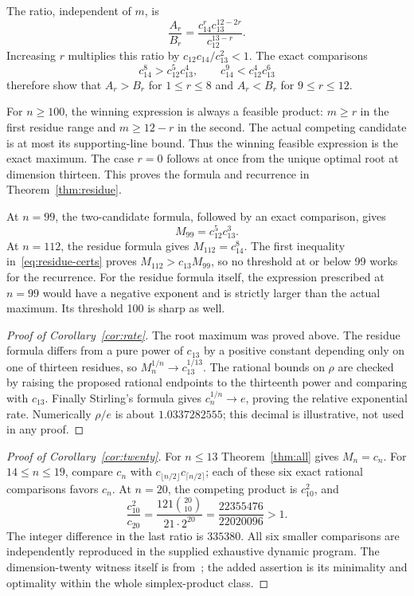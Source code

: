 \documentclass[11pt]{article}
\theoremstyle{remark}\newtheorem{remark}[theorem]{Remark}
\begin{document}
The ratio, independent of $m$, is
\[
 \frac{A_r}{B_r}
 =\frac{c_{14}^{r}c_{13}^{12-2r}}{c_{12}^{13-r}}.
\]
Increasing $r$ multiplies this ratio by $c_{12}c_{14}/c_{13}^2<1$. The exact comparisons
\begin{equation}\label{eq:residue-certs}
 c_{14}^{8}>c_{12}^{5}c_{13}^{4},\qquad
 c_{14}^{9}<c_{12}^{4}c_{13}^{6}
\end{equation}
therefore show that $A_r>B_r$ for $1\le r\le8$ and $A_r<B_r$ for $9\le r\le12$.

For $n\ge100$, the winning expression is always a feasible product: $m\ge r$ in the first residue range and $m\ge12-r$ in the second. The actual competing candidate is at most its supporting-line bound. Thus the winning feasible expression is the exact maximum. The case $r=0$ follows at once from the unique optimal root at dimension thirteen. This proves the formula and recurrence in Theorem~\ref{thm:residue}.

At $n=99$, the two-candidate formula, followed by an exact comparison, gives
\[
 M_{99}=c_{12}^{5}c_{13}^{3}.
\]
At $n=112$, the residue formula gives $M_{112}=c_{14}^{8}$. The first inequality in~\eqref{eq:residue-certs} proves $M_{112}>c_{13}M_{99}$, so no threshold at or below 99 works for the recurrence. For the residue formula itself, the expression prescribed at $n=99$ would have a negative exponent and is strictly larger than the actual maximum. Its threshold 100 is sharp as well.

\begin{proof}[Proof of Corollary~\ref{cor:rate}]
The root maximum was proved above. The residue formula differs from a pure power of $c_{13}$ by a positive constant depending only on one of thirteen residues, so $M_n^{1/n}\to c_{13}^{1/13}$. The rational bounds on $\rho$ are checked by raising the proposed rational endpoints to the thirteenth power and comparing with $c_{13}$. Finally Stirling's formula gives $c_n^{1/n}\to e$, proving the relative exponential rate. Numerically $\rho/e$ is about $1.0337282555$; this decimal is illustrative, not used in any proof.
\end{proof}

\begin{proof}[Proof of Corollary~\ref{cor:twenty}]
For $n\le13$ Theorem~\ref{thm:all} gives $M_n=c_n$. For $14\le n\le19$, compare $c_n$ with $c_{\lfloor n/2\rfloor}c_{\lceil n/2\rceil}$; each of these six exact rational comparisons favors $c_n$. At $n=20$, the competing product is $c_{10}^2$, and
\[
 \frac{c_{10}^2}{c_{20}}
 =\frac{121\binom{20}{10}}{21\cdot2^{20}}
 =\frac{22355476}{22020096}>1.
\]
The integer difference in the last ratio is $335380$. All six smaller comparisons are independently reproduced in the supplied exhaustive dynamic program. The dimension-twenty witness itself is from~\cite{OpenAI088}; the added assertion is its minimality and optimality within the whole simplex-product class.
\end{proof}
\end{document}
